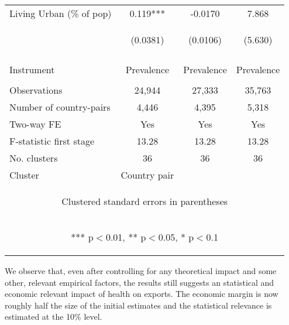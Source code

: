 \documentclass{article}
\begin{document}
\begin{table}[htbp]
{\begin{tabular}{lccc}
Living Urban (\% of pop) & 0.119*** & -0.0170 & 7.868 \\
 & \begin{footnotesize}(0.0381)\end{footnotesize} & \begin{footnotesize}(0.0106)\end{footnotesize} & \begin{footnotesize}(5.630)\end{footnotesize} \\
\vspace{4pt} & \begin{footnotesize}\end{footnotesize} & \begin{footnotesize}\end{footnotesize} & \begin{footnotesize}\end{footnotesize} \\
Instrument & Prevalence & Prevalence & Prevalence \\
\vspace{4pt} & \begin{footnotesize}\end{footnotesize} & \begin{footnotesize}\end{footnotesize} & \begin{footnotesize}\end{footnotesize} \\
Observations & 24,944 & 27,333 & 35,763 \\
Number of country-pairs & 4,446 & 4,395 & 5,318 \\
Two-way FE & Yes & Yes & Yes \\
F-statistic first stage & 13.28 & 13.28 & 13.28 \\
No. clusters & 36 & 36 & 36 \\ 
Cluster & \multicolumn{1}{c}{Country pair} \\ \hline
\multicolumn{4}{c}{\begin{footnotesize} Clustered standard errors in parentheses\end{footnotesize}} \\
\multicolumn{4}{c}{\begin{footnotesize} *** p$<$0.01, ** p$<$0.05, * p$<$0.1\end{footnotesize}} \\
\end{tabular}
}
\end{table}
We observe that, even after controlling for any theoretical impact and some other, relevant empirical factors, the results still suggests an statistical and economic relevant impact of health on exports. The economic margin is now roughly half the size of the initial estimates and the statistical relevance is estimated at the 10\% level.\\
\end{document}
